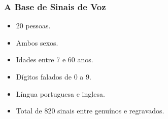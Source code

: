\begin{frame}
	\frametitle{A Base de Sinais de Voz}
	\begin{itemize}
		\item 20 pessoas.
		\item Ambos sexos.
		\item Idades entre 7 e 60 anos.
		\item Dígitos falados de 0 a 9.
		\item Língua portuguesa e inglesa.
		\item Total de 820 sinais entre genuínos e regravados.
	\end{itemize}
\end{frame}